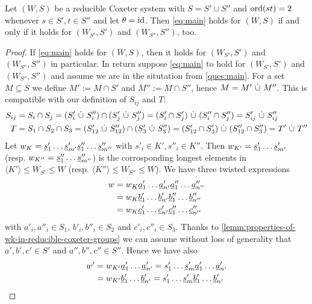 \begin{theo}
	Let $(W,S)$ be a reducible Coxeter system with $S = S' \cup S''$ and $\operatorname{ord}(st) = 2$ whenever $s \in S', t \in S''$ and let $\theta = \operatorname{id}$. Then \ref{eq:main} holds for $(W,S)$ if and only if it holds for $(W_{S'},S')$ and $(W_{S''},S'')$, too.

	\begin{proof}
		If \ref{eq:main} holds for $(W,S)$, then it holds for $(W_{S'},S')$ and $(W_{S''},S'')$ in particular. In return suppose \ref{eq:main} to hold for $(W_{S'},S')$ and $(W_{S''},S'')$ and assume we are in the situtation from \ref{ques:main}. For a set $M \subseteq S$ we define $M' := M \cap S'$ and $M'' := M \cap S''$, hence $M = M' \ \dot \cup \  M''$. This is compatible with our definition of $S_{ij}$ and $T$:
		\begin{align*}
			S_{ij}	& = S_i \cap S_j = (S'_i \ \dot \cup \  S''_i) \cap (S'_j \ \dot \cup \  S''_j) = (S'_i \cap S'_j) \ \dot \cup \  (S''_i \cap S''_j) = S'_{ij} \ \dot \cup \  S''_{ij} \\
			T		& = S_1 \cap S_2 \cap S_3 = (S'_{12} \ \dot \cup \  S''_{12}) \cap (S'_3 \ \dot \cup \  S''_3) = (S'_{12} \cap S'_3) \ \dot \cup \  (S''_{12} \cap S''_3) = T' \ \dot \cup \  T''
		\end{align*}
		Let $w_K = \underline{s}'_1 \ldots \underline{s}'_{m'} \underline{s}''_1 \ldots \underline{s}''_{m''}$ with $s'_i \in K',s''_i \in K''$. Then
		$w_{K'} = \underline{s}'_1 \ldots \underline{s}'_{m'}$ (resp. $w_{K''} = \underline{s}''_1 \ldots \underline{s}''_{m''}$) is the corrosponding longest elements in $\langle K' \rangle \leq W_{S'} \leq W$ (resp. $\langle K'' \rangle \leq W_{S''} \leq W$).
		We have three twisted expressions
		\begin{align*}
			w	& = w_K \underline{a}'_1 \ldots \underline{a}'_{n'} \underline{a}''_1 \ldots \underline{a}''_{n''} \\
				& = w_K \underline{b}'_1 \ldots \underline{b}'_{n'} \underline{b}''_1 \ldots \underline{b}''_{n''} \\
				& = w_K \underline{c}'_1 \ldots \underline{c}'_{n'} \underline{c}''_1 \ldots \underline{c}''_{n''}
		\end{align*}
		with $a'_i,a''_i \in S_1$, $b'_i,b''_i \in S_2$ and $c'_i,c''_i \in S_3$. Thanks to \ref{lemm:properties-of-wk-in-reducible-coxeter-groups} we can assume without loss of generality that $a',b',c' \in S'$ and $a'',b'',c'' \in S''$. Hence we have also
		\begin{align*}
			w'	& = w_{K'} \ul a'_1 \ldots \ul a'_{n'} = s'_1 \ldots \ul s'_m \ul a'_1 \ldots \ul a'_{n'} \\
				& = w_{K'} \ul b'_1 \ldots \ul b'_{n'} = s'_1 \ldots \ul s'_m \ul b'_1 \ldots \ul b'_{n'} \\

\end{align*}
\end{proof}
\end{theo}
